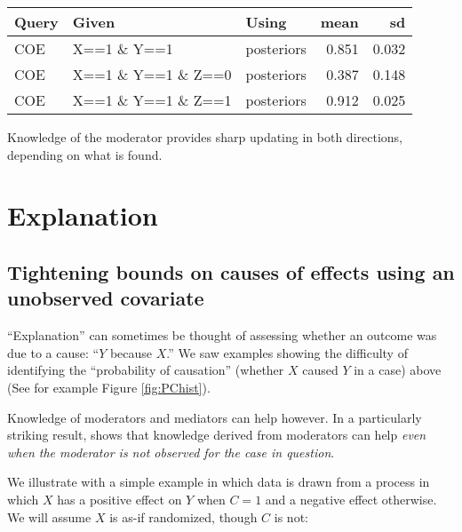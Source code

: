 \documentclass[
  12pt,
]{book}
\newenvironment{Shaded}{\begin{snugshade}}{\end{snugshade}}
\newcommand{\DataTypeTok}[1]{\textcolor[rgb]{0.13,0.29,0.53}{#1}}
\newcommand{\DecValTok}[1]{\textcolor[rgb]{0.00,0.00,0.81}{#1}}
\newcommand{\KeywordTok}[1]{\textcolor[rgb]{0.13,0.29,0.53}{\textbf{#1}}}
\newcommand{\NormalTok}[1]{#1}
\newcommand{\OperatorTok}[1]{\textcolor[rgb]{0.81,0.36,0.00}{\textbf{#1}}}
\newcommand{\OtherTok}[1]{\textcolor[rgb]{0.56,0.35,0.01}{#1}}
\newcommand{\StringTok}[1]{\textcolor[rgb]{0.31,0.60,0.02}{#1}}
\begin{document}
\begin{tabular}{l|l|l|r|r}
\hline
Query & Given & Using & mean & sd\\
\hline
COE & X==1 \& Y==1 & posteriors & 0.851 & 0.032\\
\hline
COE & X==1 \& Y==1 \& Z==0 & posteriors & 0.387 & 0.148\\
\hline
COE & X==1 \& Y==1 \& Z==1 & posteriors & 0.912 & 0.025\\
\hline
\end{tabular}

Knowledge of the moderator provides sharp updating in both directions, depending on what is found.

\hypertarget{explanation}{%
\chapter{Explanation}\label{explanation}}

\hypertarget{tightening-bounds-on-causes-of-effects-using-an-unobserved-covariate}{%
\section{Tightening bounds on causes of effects using an unobserved covariate}\label{tightening-bounds-on-causes-of-effects-using-an-unobserved-covariate}}

``Explanation'' can sometimes be thought of assessing whether an outcome was due to a cause: ``\(Y\) because \(X\).'' We saw examples showing the difficulty of identifying the ``probability of causation'' (whether \(X\) caused \(Y\) in a case) above (See for example Figure \ref{fig:PChist}).

Knowledge of moderators and mediators can help however. In a particularly striking result, \citet{dawid2011role} shows that knowledge derived from moderators can help \emph{even when the moderator is not observed for the case in question}.

We illustrate with a simple example in which data is drawn from a process in which \(X\) has a positive effect on \(Y\) when \(C=1\) and a negative effect otherwise. We will assume \(X\) is as-if randomized, though \(C\) is not:

\begin{Shaded}
\end{Shaded}
\end{document}
